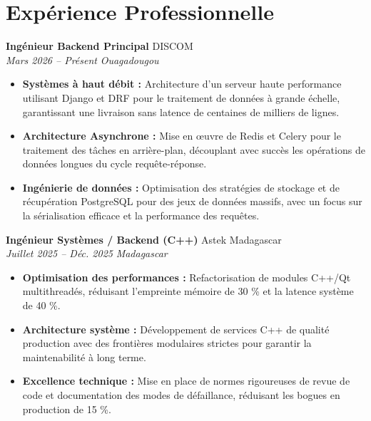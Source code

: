 \documentclass[a4paper,10pt]{article}
\newcommand{\jobheader}[4]{%
    \textbf{#1} \hfill #2 \\
    \textit{#3} \hfill \textit{#4}
    \vspace{0.05cm}
}
\begin{document}
\section*{Expérience Professionnelle}

\jobheader{Ingénieur Backend Principal}{DISCOM}{Mars 2026 -- Présent}{Ouagadougou}
\begin{itemize}[leftmargin=*,nosep]
    \item \textbf{Systèmes à haut débit :} Architecture d'un serveur haute performance utilisant Django et DRF pour le traitement de données à grande échelle, garantissant une livraison sans latence de centaines de milliers de lignes.
    \item \textbf{Architecture Asynchrone :} Mise en œuvre de Redis et Celery pour le traitement des tâches en arrière-plan, découplant avec succès les opérations de données longues du cycle requête-réponse.
    \item \textbf{Ingénierie de données :} Optimisation des stratégies de stockage et de récupération PostgreSQL pour des jeux de données massifs, avec un focus sur la sérialisation efficace et la performance des requêtes.
\end{itemize}

\vspace{0.15cm}

\jobheader{Ingénieur Systèmes / Backend (C++)}{Astek Madagascar}{Juillet 2025 -- Déc. 2025}{Madagascar}
\begin{itemize}[leftmargin=*,nosep]
    \item \textbf{Optimisation des performances :} Refactorisation de modules C++/Qt multithreadés, réduisant l'empreinte mémoire de 30 \% et la latence système de 40 \%.
    \item \textbf{Architecture système :} Développement de services C++ de qualité production avec des frontières modulaires strictes pour garantir la maintenabilité à long terme.
    \item \textbf{Excellence technique :} Mise en place de normes rigoureuses de revue de code et documentation des modes de défaillance, réduisant les bogues en production de 15 \%.
\end{itemize}

\vspace{0.15cm}
\end{document}
